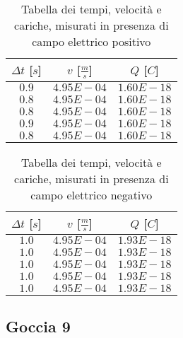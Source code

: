 \documentclass{article}
\begin{document}
\begin{multicols}{2}

\begin{table}[H]
	\centering
	\begin{tabular}{| c | c | c |}
		\hline
		$\Delta t$ [$s$] & $v$ [$\frac ms$] & $Q$ [$C$] \\
		\hline
		$0.9$ & $4.95E-04$ & $1.60E-18$ \\
		$0.8$ & $4.95E-04$ & $1.60E-18$ \\
		$0.8$ & $4.95E-04$ & $1.60E-18$ \\
		$0.9$ & $4.95E-04$ & $1.60E-18$ \\
		$0.8$ & $4.95E-04$ & $1.60E-18$ \\
		\hline
	\end{tabular}
	\caption{Tabella dei tempi, velocità e cariche, misurati in presenza di campo elettrico positivo}
	\label{}
\end{table}

\columnbreak

\begin{table}[H]
	\centering
	\begin{tabular}{| c | c | c |}
		\hline
		$\Delta t$ [$s$] & $v$ [$\frac ms$] & $Q$ [$C$] \\
		\hline
		$1.0$ & $4.95E-04$ & $1.93E-18$ \\
		$1.0$ & $4.95E-04$ & $1.93E-18$ \\
		$1.0$ & $4.95E-04$ & $1.93E-18$ \\
		$1.0$ & $4.95E-04$ & $1.93E-18$ \\
		$1.0$ & $4.95E-04$ & $1.93E-18$ \\
		\hline		
	\end{tabular}
	\caption{Tabella dei tempi, velocità e cariche, misurati in presenza di campo elettrico negativo}
	\label{}
\end{table}
	
\end{multicols}

\subsection{Goccia 9}
\end{document}
